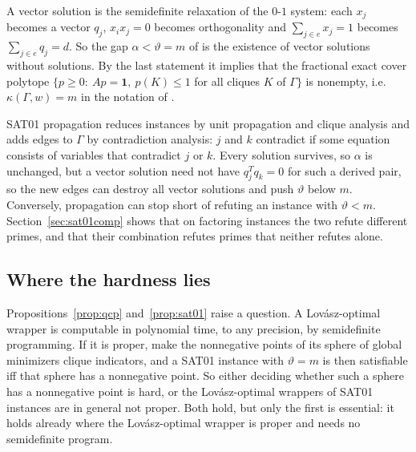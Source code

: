 \documentclass[11pt]{article}
\theoremstyle{definition}
\theoremstyle{remark}
\newcommand{\one}{\mathbf{1}}
\begin{document}
A vector solution is the semidefinite relaxation of the $0$-$1$ system: each
$x_j$ becomes a vector $q_j$, $x_ix_j=0$ becomes orthogonality and
$\sum_{j\in e}x_j=1$ becomes $\sum_{j\in e}q_j=d$. So the gap $\alpha<\vartheta=m$
of \cite{Bu07} is the existence of vector solutions without solutions. By the
last statement it implies that the fractional exact cover polytope
$\{p\geq0:\ Ap=\one,\ p(K)\leq1$ for all cliques $K$ of $\Gamma\}$ is nonempty,
i.e. $\kappa(\Gamma,w)=m$ in the notation of \cite{Bu07}.

SAT01 propagation \cite[Section~3]{Bu07} reduces instances by unit
propagation and clique analysis and adds edges to $\Gamma$ by contradiction
analysis: $j$ and $k$ contradict if some equation consists of variables that
contradict $j$ or $k$. Every solution survives, so $\alpha$ is unchanged, but
a vector solution need not have $q_j^Tq_k=0$ for such a derived pair, so the
new edges can destroy all vector solutions and push $\vartheta$ below $m$.
Conversely, propagation can stop short of refuting an instance with
$\vartheta<m$. Section~\ref{sec:sat01comp} shows that on
factoring instances the two refute different primes, and that their
combination refutes primes that neither refutes alone.

\subsection{Where the hardness lies}
\label{sec:hardness}

Propositions~\ref{prop:qcp} and~\ref{prop:sat01} raise a question. A
Lov\'asz-optimal wrapper is computable in polynomial time, to any precision,
by semidefinite programming. If it is proper, \cite[Propositions~1
and~2]{CW} make the nonnegative points of its sphere of global minimizers
clique indicators, and a SAT01 instance with $\vartheta=m$ is then
satisfiable iff that sphere has a nonnegative point. So either deciding
whether such a sphere has a nonnegative point is hard, or the
Lov\'asz-optimal wrappers of SAT01 instances are in general not proper. Both
hold, but only the first is essential: it holds already where the
Lov\'asz-optimal wrapper is proper and needs no semidefinite program.
\end{document}
